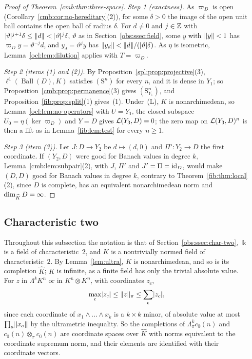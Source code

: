 \begin{proof}[Proof of Theorem~\ref{cmb:thm:three-space}]
\emph{Step 1 (exactness).} As $\varpi_D$ is open (Corollary~\ref{cmb:cor:no-hereditary}(2)), for some $\delta>0$ the
image of the open unit ball contains the open ball of radius $\delta$. For $d\ne0$ and $j\in\mathbb Z$ with
$\lvert \vartheta\rvert^{j+1}\delta\le\lVert d\rVert<\lvert \vartheta\rvert^j\delta$, $\vartheta$ as in Section~\ref{obs:ssec:field}, some $y$ with
$\lVert y\rVert<1$ has $\varpi_Dy=\vartheta^{-j}d$, and $y_d=\vartheta^jy$ has $\lVert y_d\rVert<\lVert d\rVert/(\lvert \vartheta\rvert\delta)$. As
$\eta$ is isometric, Lemma~\ref{ocl:lem:dilution} applies with $T=\varpi_D$.

\emph{Step 2 (items (1) and (2)).} By Proposition~\ref{spl:prop:projective}(3), $\ell^1(\operatorname{Ball}(D),K)$
satisfies $(\mathrm S^n)$ for every $n$, and it is dense in $Y_1$; so Proposition~\ref{cmb:prop:permanence}(3) gives
$(\mathrm S^n_{Y_1})$, and Proposition~\ref{fib:prop:split}(1) gives~(1). Under~(L), $K$ is nonarchimedean, so
Lemma~\ref{ocl:lem:no-operators} with $U=Y_1$, the closed subspace $U_0=\eta(\ker\varpi_D)$ and $Y=D$ gives
$\mathcal L(Y_3,D)=0$; the zero map on $\mathcal L(Y_3,D)^n$ is then a lift as in Lemma~\ref{fib:lem:test} for every $n\ge1$.

\emph{Step 3 (item (3)).} Let $J\colon D\to Y_2$ be $d\mapsto(d,0)$ and $\Pi'\colon Y_2\to D$ the first coordinate. If
$(Y_2,D)$ were good for Banach values in degree $k$, Lemma~\ref{cmb:lem:subpair}(2), with $J$, $\Pi'$ and
$J'=\Pi=\mathrm{id}_D$, would make $(D,D)$ good for Banach values in degree $k$, contrary to Theorem~\ref{fib:thm:local}(2),
since $D$ is complete, has an equivalent nonarchimedean norm and $\dim_{\widehat K}D=\infty$.
\end{proof}

\subsection{Characteristic two}\label{ocl:ssec:char-two}

Throughout this subsection the notation is that of Section~\ref{obs:ssec:char-two}, $\Bbbk$ is a field of
characteristic~$2$, and $K$ is a nontrivially normed field of characteristic~$2$. By Lemma~\ref{lem:ultra}, $K$ is
nonarchimedean, and so is its completion $\widehat K$; $K$ is infinite, as a finite field has only the trivial absolute
value. For $z$ in $\Lambda^kK^{n}$ or in $K^{n}\otimes K^{n}$, with coordinates $z_c$,
\begin{equation}\label{ocl:eq:coordinates}
\max_c\lvert z_c\rvert\le\lVert z\rVert_\pi\le\sum_c\lvert z_c\rvert,
\end{equation}
since each coordinate of $x_1\wedge\dots\wedge x_k$ is a $k\times k$ minor, of absolute value at most $\prod_a\lVert x_a\rVert$
by the ultrametric inequality. So the completions of $\Lambda^k_\pi c_0(n)$ and $c_0(n)\otimes_\pi c_0(n)$ are coordinate
spaces over $\widehat K$ with norms equivalent to the coordinate supremum norm, and their elements are identified with
their coordinate vectors.

